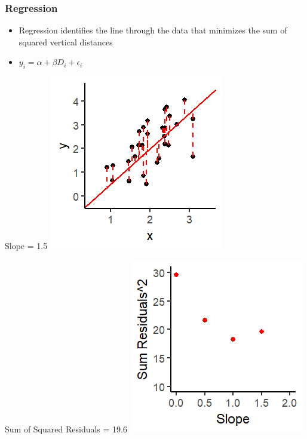 \documentclass[xcolor=x11names,compress]{beamer}\usepackage[]{graphicx}\usepackage[]{color}
\makeatletter
\def\maxwidth{ %
  \ifdim\Gin@nat@width>\linewidth
    \linewidth
  \else
    \Gin@nat@width
  \fi
}
\newenvironment{knitrout}{}{} %
\renewcommand{\(}{\begin{columns}}
\renewcommand{\)}{\end{columns}}
\newcommand{\<}[1]{\begin{column}{#1}}
\renewcommand{\>}{\end{column}}
\makeatother
\begin{document}
\begin{frame}
\frametitle{Regression}
\begin{itemize}
\item Regression identifies the line through the data that minimizes the sum of squared vertical distances 
\item $y_i = \alpha + \beta D_i + \epsilon_i$
\end{itemize}
\begin{multicols}{2}
Slope = 1.5
\begin{knitrout}
\color{fgcolor}
\includegraphics[width=\maxwidth]{figure/graph_ols4-1} 

\end{knitrout}
\columnbreak
Sum of Squared Residuals = 19.6
\begin{knitrout}
\color{fgcolor}
\includegraphics[width=\maxwidth]{figure/graph_ssr4-1} 

\end{knitrout}
\end{multicols}
\end{frame}
\end{document}
